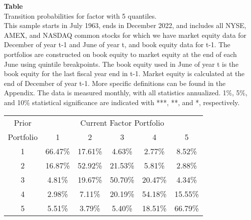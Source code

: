 \begin{table*}[ht!]
\raggedright
{}
\label{tab: transition_probs_OP_BE_with_5_quantiles}
\textbf{Table \thetable} \\
Transition probabilities for factor with 5 quantiles. \\
\hspace*{1em}This sample starts in July 1963, ends in December 2022, and includes all NYSE, AMEX, and NASDAQ common stocks for which we have market equity data for December of year t-1 and June of year t, and book equity data for t-1. The portfolios are constructed on book equity to market equity at the end of each June using quintile breakpoints.  The book equity used in June of year t is the book equity for the last fiscal year end in t-1.  Market equity is calculated at the end of December of year t-1.  More specific definitions can be found in the Appendix.  The data is measured monthly, with all statistics annualized.  1\%, 5\%, and 10\% statistical significance are indicated with ***, **, and *, respectively. \\
\vspace{0.5em}
\centering
\begin{adjustbox}{max width=\textwidth}
\begin{tabular}{@{}cccccc@{}}
\toprule
Prior & \multicolumn{5}{c}{Current Factor Portfolio} \\
Portfolio & 1 & 2 & 3 & 4 & 5 \\
\midrule
1 & 66.47\% & 17.61\% & 4.63\% & 2.77\% & 8.52\% \\
2 & 16.87\% & 52.92\% & 21.53\% & 5.81\% & 2.88\% \\
3 & 4.81\% & 19.67\% & 50.70\% & 20.47\% & 4.34\% \\
4 & 2.98\% & 7.11\% & 20.19\% & 54.18\% & 15.55\% \\
5 & 5.51\% & 3.79\% & 5.40\% & 18.51\% & 66.79\% \\
\bottomrule
\end{tabular}
\end{adjustbox}
\end{table*}